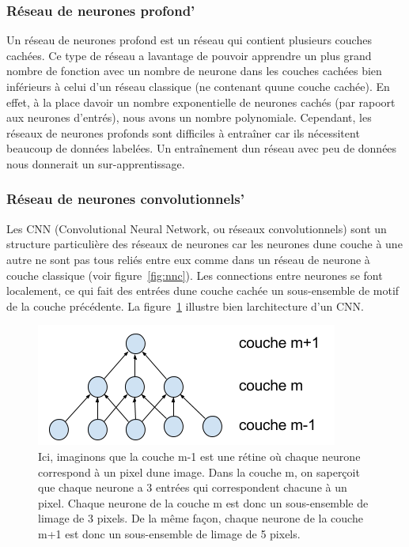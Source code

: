 \documentclass[11pt]{sdm}
\begin{document}
		\subsubsection{R\'eseau de neurones profond'}
			Un r\'eseau de neurones profond est un r\'eseau qui contient plusieurs couches cach\'ees. Ce type de r\'eseau a l\textquotesingle avantage de pouvoir apprendre un plus grand nombre de fonction avec un nombre de neurone dans les couches cach\'ees bien inf\'erieurs \`a celui d'un r\'eseau classique (ne contenant qu\textquotesingle une couche cach\'ee). En effet, \`a la place d\textquotesingle avoir un nombre exponentielle de neurones cach\'es (par rapoort aux neurones d'entr\'es), nous avons un nombre polynomiale.
			Cependant, les r\'eseaux de neurones profonds sont difficiles \`a entra\^iner car ils n\'ecessitent beaucoup de donn\'ees label\'ees. Un entra\^inement d\textquotesingle un r\'eseau avec peu de donn\'ees nous donnerait un sur-apprentissage.
			
		\subsubsection{R\'eseau de neurones convolutionnels'}
			Les CNN (Convolutional Neural Network, ou r\'eseaux convolutionnels) sont un structure particuli\`ere des r\'eseaux de neurones car les neurones d\textquotesingle une couche \`a une autre ne sont pas tous reli\'es entre eux comme dans un r\'eseau de neurone \`a couche classique (voir figure~\ref{fig:nnc}). Les connections entre neurones se font localement, ce qui fait des entr\'ees d\textquotesingle une couche cach\'ee un sous-ensemble de motif de la couche pr\'ec\'edente. La figure~\ref{fig:cnn} illustre bien l\textquotesingle architecture d'un CNN.

				\begin{figure}[!ht]
					\centering
					\includegraphics[natwidth=375,natheight=152]{figures/architectureCNN.png}
					\caption{Ici, imaginons que la couche m-1 est une r\'etine o\`u chaque neurone correspond \`a un pixel d\textquotesingle une image. Dans la couche m, on s\textquotesingle aper\c coit que chaque neurone a 3 entr\'ees qui correspondent chacune \`a un pixel. Chaque neurone de la couche m est donc un sous-ensemble de l\textquotesingle image de 3 pixels. De la m\^eme fa\c con, chaque neurone de la couche m+1 est donc un sous-ensemble de l\textquotesingle image de 5 pixels.}
					\label{fig:cnn}
				\end{figure}
\end{document}
